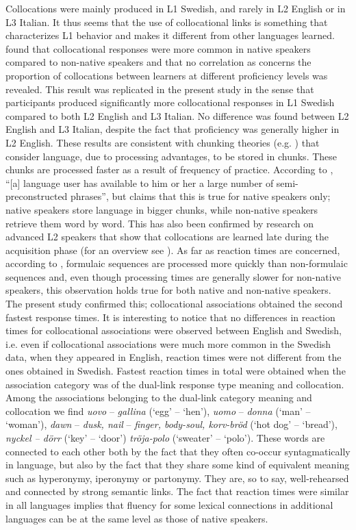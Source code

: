 \documentclass[output=paper,colorlinks,citecolor=brown,nonflat]{langsci/langscibook}
\begin{document}
Collocations were mainly produced in L1 Swedish, and rarely in L2 English or in L3 Italian. It thus seems that the use of collocational links is something that characterizes L1 behavior and makes it different from other languages learned. \citet{Fitzpatrick2006} found that collocational responses were more common in native speakers compared to non-native speakers and that no correlation as concerns the proportion of collocations between learners at different proficiency levels was revealed. This result was replicated in the present study in the sense that participants produced significantly more collocational responses in L1 Swedish compared to both L2 English and L3 Italian. No difference was found between L2 English and L3 Italian, despite the fact that proficiency was generally higher in L2 English. These results are consistent with chunking theories (e.g. \citealt{EllisN1996, Wray2002}) that consider language, due to processing advantages, to be stored in chunks. These chunks are processed faster as a result of frequency of practice. According to \citet[110]{Sinclair1991}, “[a] language user has available to him or her a large number of semi-preconstructed phrases”, but \citet{Wray2002} claims that this is true for native speakers only; native speakers store language in bigger chunks, while non-native speakers retrieve them word by word. This has also been confirmed by research on advanced L2 speakers that show that collocations are learned late during the acquisition phase (for an overview see \citealt{ErmanEtAl2016}). As far as reaction times are concerned, according to \citet[141]{ErmanEtAl2016}, formulaic sequences are processed more quickly than non-formulaic sequences and, even though processing times are generally slower for non-native speakers, this observation holds true for both native and non-native speakers. The present study confirmed this; collocational associations obtained the second fastest response times. It is interesting to notice that no differences in reaction times for collocational associations were observed between English and Swedish, i.e. even if collocational associations were much more common in the Swedish data, when they appeared in English, reaction times were not different from the ones obtained in Swedish. Fastest reaction times in total were obtained when the association category was of the dual-link response type meaning and collocation. Among the associations belonging to the dual-link category meaning and collocation we find \textit{uovo} -- \textit{gallina} (‘egg’ -- ‘hen’), \textit{uomo} -- \textit{donna} (‘man’ -- ‘woman’), \textit{dawn} -- \textit{dusk, nail} -- \textit{finger, body-soul, korv-bröd} (‘hot dog’ -- ‘bread’), \textit{nyckel – dörr} (‘key’ -- ‘door’) \textit{tröja-polo} (‘sweater’ -- ‘polo’). These words are connected to each other both by the fact that they often co-occur syntagmatically in language, but also by the fact that they share some kind of equivalent meaning such as hyperonymy, iperonymy or partonymy. They are, so to say, well-rehearsed and connected by strong semantic links. The fact that reaction times were similar in all languages implies that fluency for some lexical connections in additional languages can be at the same level as those of native speakers.
\end{document}
